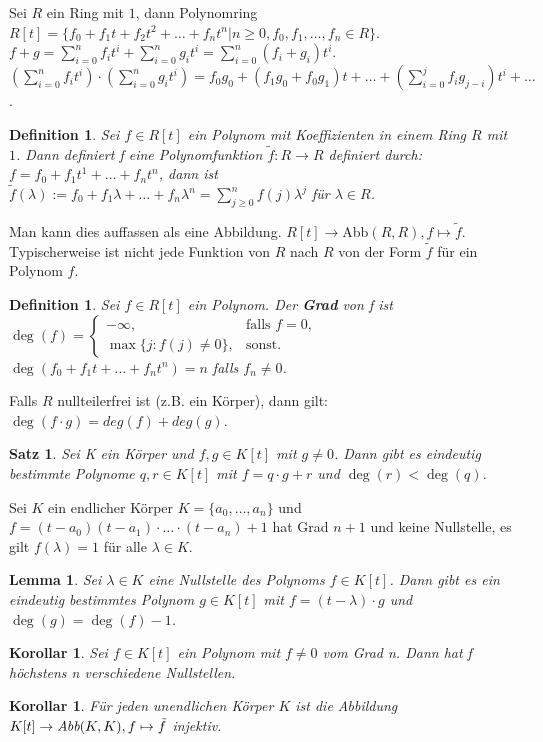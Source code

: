 \documentclass[12pt,a4paper]{article}
\theoremstyle{plain}
\newtheorem{Satz}[Theorem]{Satz}
\newtheorem{Lemma}[Theorem]{Lemma}
\newtheorem{Korollar}[Theorem]{Korollar}
\newtheorem{Definition}[Theorem]{Definition}
\newcommand{\herv}[1]{{\emph{\textbf{#1}}}}
\numberwithin{equation}{section}
\begin{document}
Sei $R$ ein Ring mit $1$, dann Polynomring $R[t]=\{f_0+f_1t+f_2t^2+\ldots+f_nt^n | n\geq 0, f_0,f_1,\ldots,f_n\in R\}$. $f+g=\sum_{i=0}^{n}{f_it^i}+\sum_{i=0}^{n}{g_it^i}=\sum_{i=0}^{n}{(f_i+g_i)t^i}$. $\left(\sum_{i=0}^{n}{f_it^i}\right)\cdot \left(\sum_{i=0}^{n}{g_it^i}\right)=f_0g_0+(f_1g_0+f_0g_1)t+\ldots+\left(\sum_{i=0}^{j}{f_ig_{j-i}}\right)t^i+\ldots$.
\begin{Definition}
Sei $f\in R[t]$ ein Polynom mit Koeffizienten in einem Ring $R$ mit $1$. Dann definiert f eine Polynomfunktion $\tilde{f}:R \rightarrow R$ definiert durch: $f=f_0+f_1t^1+\ldots+f_nt^n$, dann ist $\tilde{f}(\lambda):=f_0+f_1\lambda+\ldots+f_n\lambda^n=\sum_{j\geq 0}^n{f(j)\lambda^j}$ für $\lambda\in R$.
\end{Definition}
Man kann dies auffassen als eine Abbildung. $R[t]\rightarrow $Abb$(R,R), f\mapsto \tilde{f}$. Typischerweise ist nicht jede Funktion von $R$ nach $R$ von der Form $\tilde{f}$ für ein Polynom $f$.
\begin{Definition}
Sei $f\in R[t]$ ein Polynom. Der \herv{Grad} von f ist\\ $\deg(f)=\left\lbrace\begin{array}{ll} -\infty,&\text{falls }f=0,\\ \max\{j: f(j)\neq 0\},&\text{sonst.}\end{array} \right.$ $\deg(f_0+f_1t+\ldots+f_nt^n)=n$ falls $f_n\neq 0$.
\end{Definition}
Falls $R$ nullteilerfrei ist (z.B. ein Körper), dann gilt: $\deg(f\cdot g)=deg(f)+deg(g)$.
\begin{Satz}
Sei K ein Körper und $f,g\in K[t]$ mit $g\neq 0$. Dann gibt es eindeutig bestimmte Polynome $q,r\in K[t]$ mit $f=q\cdot g+r$ und $\deg(r)<\deg(q)$.
\end{Satz}
Sei $K$ ein endlicher Körper $K=\{a_0,\ldots,a_n\}$ und $f=(t-a_0)(t-a_1)\cdot\ldots\cdot(t-a_n)+1$ hat Grad $n+1$ und keine Nullstelle, es gilt $f(\lambda)=1$ für alle $\lambda\in K$.
\begin{Lemma}
Sei $\lambda\in K$ eine Nullstelle des Polynoms $f\in K[t]$. Dann gibt es ein eindeutig bestimmtes Polynom $g\in K[t]$ mit $f=(t-\lambda)\cdot g$ und $\deg(g)=\deg(f)-1$.
\end{Lemma}
\begin{Korollar}
Sei $f\in K[t]$ ein Polynom mit $f\neq 0$ vom Grad n. Dann hat f höchstens n verschiedene Nullstellen.
\end{Korollar}
\begin{Korollar}
Für jeden unendlichen Körper $K$ ist die Abbildung $K[t]\rightarrow \emph{Abb}(K,K), f\mapsto \tilde{f}$ injektiv.
\end{Korollar}
\end{document}
